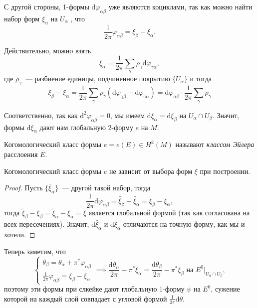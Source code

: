 	С другой стороны, 1-формы $\mathrm{d}\varphi_{\alpha \beta}$ уже являются коциклами, так как можно найти набор форм $\xi_{\alpha}$ на $U_{\alpha}$ , что 
	\[
		\frac{1}{2\pi} \varphi_{\alpha \beta} = \xi_{\beta} - \xi_{\alpha}. 
	\]

	Действительно, можно взять 
	\[
		\xi_{\alpha} = \frac{1}{2\pi} \sum_{\gamma} \rho_{\gamma} \mathrm{d} \varphi_{\gamma \alpha},
	\]
	где $\rho_{\gamma}$~--- разбиение единицы, подчиненное покрытию $\{ U_{\alpha} \}$ и тогда 
	\[
		\xi_{\beta} - \xi_{\alpha} = \frac{1}{2\pi} \sum_{\gamma} \rho_{\gamma} (\mathrm{d}\varphi_{\gamma \beta} - \mathrm{d}\varphi_{\gamma \alpha}) = \mathrm{d} \varphi_{\alpha \beta} \cdot \frac{1}{2\pi}\sum_{\gamma} \rho_{\gamma} 
	\]

	Соответственно, так как $\mathrm{d}^2 \varphi_{\alpha \beta} = 0$, мы имеем $\mathrm{d}\xi_{\alpha} = \mathrm{d}\xi_{\beta}$ на $U_{\alpha} \cap U_{\beta}$. Значит, формы $\mathrm{d}\xi_{\alpha}$ дают нам глобальную 2-форму $e$ на $M$. 
	
	\begin{definition} 
		Когомологический класс формы $e = e(E) \in H^2(M)$ называют \emph{классом Эйлера} расслоения $E$. 
	\end{definition}	

	\begin{statement} 
		Когомологический класс формы $e$ не зависит от выбора форм $\xi$ при построении. 
	\end{statement}
	\begin{proof}
		
		Пусть $\{ \widetilde{\xi_{\alpha}}\}$~--- другой такой набор, тогда 
		\[
			\frac{1}{2\pi} \mathrm{d}\varphi_{\alpha \beta} = \widetilde{\xi_{\beta}} - \widetilde{\xi_{\alpha}} = \xi_{\beta} - \xi_{\alpha},
		\]
		тогда $\widetilde{\xi}_{\beta} - \xi_{\beta} = \widetilde{\xi}_{\alpha} - \xi_{\alpha} = \xi$ является глобальной формой (так как согласована на всех пересечениях). Значит, $\mathrm{d}\widetilde{\xi_{\alpha}}$ и $\mathrm{d}\xi_{\alpha}$  отличаются на точную форму, как мы и хотели. 
	\end{proof}

	Теперь заметим, что 
	\[
		\begin{cases} \theta_{\beta} = \theta_{\alpha} + \pi^*\varphi_{\alpha \beta} \\ \frac{1}{2\pi} \varphi_{\alpha \beta} = \xi_{\beta} - \xi_{\alpha} \end{cases} \implies \frac{\mathrm{d}\theta_{\alpha}}{2\pi} - \pi^* \xi_{\alpha} = \frac{\mathrm{d}\theta_{\beta}}{2\pi} - \pi^* \xi_{\beta} \text{ на } E^0\vert_{U_{\alpha} \cap U_{\beta}},
	\]
	поэтому эти формы при слкейке дают глобальную 1-форму $\psi$ на $E^0$, сужение которой на каждый слой совпадает с угловой формой $\frac{1}{2\pi} \mathrm{d}\theta$. 

